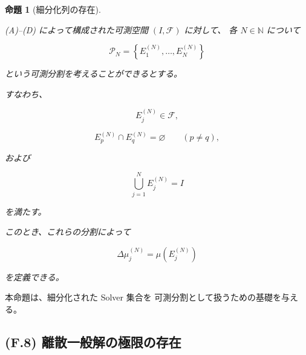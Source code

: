 \documentclass[a4paper,11pt]{article}
\newtheorem{proposition}[definition]{命題}
\begin{document}
\begin{proposition}[細分化列の存在]
\label{prop:F-partition-existence}

(A)--(D) によって構成された可測空間 $(I,\mathcal{F})$ に対して、
各 $N\in\mathbb{N}$ について

\begin{equation}
    \mathcal{P}_N
    =
    \left\{
        E_1^{(N)},
        \ldots,
        E_N^{(N)}
    \right\}
\end{equation}

という可測分割を考えることができるとする。

すなわち、

\begin{equation}
    E_j^{(N)}\in\mathcal{F},
\end{equation}

\begin{equation}
    E_p^{(N)}
    \cap
    E_q^{(N)}
    =
    \varnothing
    \qquad(p\neq q),
\end{equation}

および

\begin{equation}
    \bigcup_{j=1}^{N}
    E_j^{(N)}
    =
    I
\end{equation}

を満たす。

このとき、これらの分割によって

\begin{equation}
    \Delta\mu_j^{(N)}
    =
    \mu(E_j^{(N)})
\end{equation}

を定義できる。
\end{proposition}

本命題は、細分化された Solver 集合を
可測分割として扱うための基礎を与える。


\subsection{(F.8) 離散一般解の極限の存在}
\label{subsec:F8}
\end{document}
